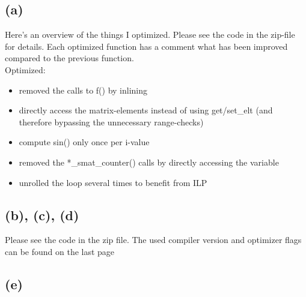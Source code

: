 \documentclass[10pt,a4paper,oneside,notitlepage]{report}
\begin{document}
\subsection*{(a)}
Here's an overview of the things I optimized. Please see the code in the zip-file for details.
Each optimized function has a comment what has been improved compared to the previous function. \\
Optimized:
\begin{itemize}
\item removed the calls to f() by inlining
\item directly access the matrix-elements instead of using get/set\_elt (and therefore bypassing the unnecessary range-checks)
\item compute sin() only once per i-value
\item removed the *\_smat\_counter() calls by directly accessing the variable
\item unrolled the loop several times to benefit from ILP
\end{itemize}

\subsection*{(b), (c), (d)}
Please see the code in the zip file. The used compiler version and optimizer flags can be found on the last page

\subsection*{(e)}
\end{document}
